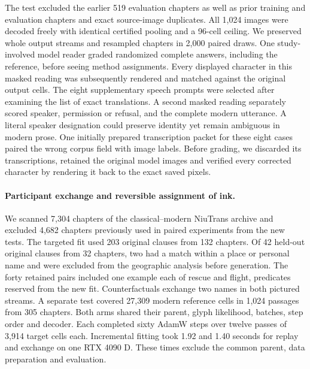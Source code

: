 \documentclass[12pt,a4paper]{article}
\providecommand{\DIFadd}[1]{{\protect\color{blue} \sf #1}} %
\begin{document}
\DIFadd{The test excluded the earlier 519 evaluation chapters as well as prior training and evaluation chapters and exact source-image duplicates. All 1,024 images were decoded freely with identical certified pooling and a 96-cell ceiling. We preserved whole output streams and resampled chapters in 2,000 paired draws. One study-involved model reader graded randomized complete answers, including the reference, before seeing method assignments. Every displayed character in this masked reading was subsequently rendered and matched against the original output cells. The eight supplementary speech prompts were selected after examining the list of exact translations. A second masked reading separately scored speaker, permission or refusal, and the complete modern utterance. A literal speaker designation could preserve identity yet remain ambiguous in modern prose. One initially prepared transcription packet for these eight cases paired the wrong corpus field with image labels. Before grading, we discarded its transcriptions, retained the original model images and verified every corrected character by rendering it back to the exact saved pixels.
}

\paragraph{\DIFadd{Participant exchange and reversible assignment of ink.}}
\DIFadd{We scanned 7,304 chapters of the classical--modern NiuTrans archive and excluded 4,682 chapters previously used in paired experiments from the new tests. The targeted fit used 203 original clauses from 132 chapters. Of 42 held-out original clauses from 32 chapters, two had a match within a place or personal name and were excluded from the geographic analysis before generation. The forty retained pairs included one example each of rescue and flight, predicates reserved from the new fit. Counterfactuals exchange two names in both pictured streams. A separate test covered 27,309 modern reference cells in 1,024 passages from 305 chapters. Both arms shared their parent, glyph likelihood, batches, step order and decoder. Each completed sixty AdamW steps over twelve passes of 3,914 target cells each. Incremental fitting took 1.92 and 1.40 seconds for replay and exchange on one RTX 4090 D. These times exclude the common parent, data preparation and evaluation.
}
\end{document}
